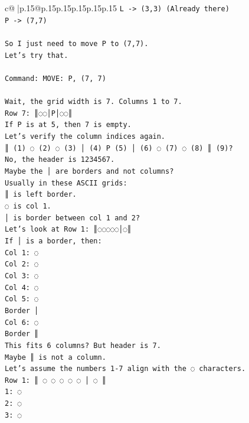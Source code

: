 \documentclass{article}
\begin{document}
{\begin{supertabular}{c@{$\;$}|p{.15\linewidth}@{}p{.15\linewidth}p{.15\linewidth}p{.15\linewidth}p{.15\linewidth}p{.15\linewidth}}
{{{\texttt{L {-}> (3,3) (Already there)} \\
\texttt{P {-}> (7,7)} \\
\\ 
\texttt{So I just need to move P to (7,7).} \\
\texttt{Let's try that.} \\
\\ 
\texttt{Command: MOVE: P, (7, 7)} \\
\\ 
\texttt{Wait, the grid width is 7. Columns 1 to 7.} \\
\texttt{Row 7: ║◌◌│P│◌◌║} \\
\texttt{If P is at 5, then 7 is empty.} \\
\texttt{Let's verify the column indices again.} \\
\texttt{║ (1) ◌ (2) ◌ (3) │ (4) P (5) │ (6) ◌ (7) ◌ (8) ║ (9)?} \\
\texttt{No, the header is 1234567.} \\
\texttt{Maybe the │ are borders and not columns?} \\
\texttt{Usually in these ASCII grids:} \\
\texttt{║ is left border.} \\
\texttt{◌ is col 1.} \\
\texttt{│ is border between col 1 and 2?} \\
\texttt{Let's look at Row 1: ║◌◌◌◌◌│◌║} \\
\texttt{If │ is a border, then:} \\
\texttt{Col 1: ◌} \\
\texttt{Col 2: ◌} \\
\texttt{Col 3: ◌} \\
\texttt{Col 4: ◌} \\
\texttt{Col 5: ◌} \\
\texttt{Border │} \\
\texttt{Col 6: ◌} \\
\texttt{Border ║} \\
\texttt{This fits 6 columns? But header is 7.} \\
\texttt{Maybe ║ is not a column.} \\
\texttt{Let's assume the numbers 1{-}7 align with the ◌ characters.} \\
\texttt{Row 1: ║ ◌ ◌ ◌ ◌ ◌ │ ◌ ║} \\
\texttt{1: ◌} \\
\texttt{2: ◌} \\
\texttt{3: ◌} \\
}}}
\end{supertabular}}
\end{document}
